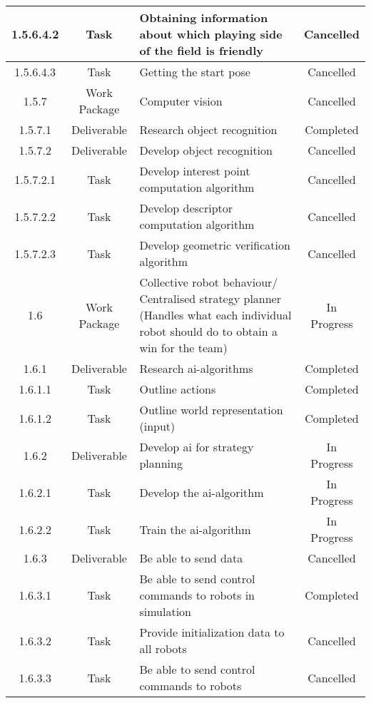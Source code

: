 \begin{longtable}{|c|c|m{}|c|}
    \rowcolor{c} 1.5.6.4.2 & Task & Obtaining information about which playing side of the field is friendly & Cancelled \\ \hline
    \rowcolor{c} 1.5.6.4.3 & Task & Getting the start pose & Cancelled \\ \hline
    \rowcolor{c} 1.5.7 & Work Package & Computer vision & Cancelled \\ \hline
    \rowcolor{d} 1.5.7.1 & Deliverable & Research object recognition & Completed \\ \hline
    \rowcolor{c} 1.5.7.2 & Deliverable & Develop object recognition & Cancelled \\ \hline
    \rowcolor{c} 1.5.7.2.1 & Task & Develop interest point computation algorithm & Cancelled \\ \hline
    \rowcolor{c} 1.5.7.2.2 & Task & Develop descriptor computation algorithm & Cancelled \\ \hline
    \rowcolor{c} 1.5.7.2.3 & Task & Develop geometric verification algorithm & Cancelled \\ \hline
    \rowcolor{p} 1.6 & Work Package & Collective robot behaviour/ Centralised strategy planner (Handles what each individual robot should do to obtain a win for the team) & In Progress \\ \hline
    \rowcolor{d} 1.6.1 & Deliverable & Research \acs{ai}-algorithms & Completed \\ \hline
    \rowcolor{d} 1.6.1.1 & Task & Outline actions & Completed \\ \hline
    \rowcolor{d} 1.6.1.2 & Task & Outline world representation (input) & Completed \\ \hline
    \rowcolor{p} 1.6.2 & Deliverable & Develop \acs{ai} for strategy planning & In Progress \\ \hline
    \rowcolor{p} 1.6.2.1 & Task & Develop the \acs{ai}-algorithm & In Progress \\ \hline
    \rowcolor{p} 1.6.2.2 & Task & Train the \acs{ai}-algorithm & In Progress \\ \hline
    \rowcolor{c} 1.6.3 & Deliverable & Be able to send data & Cancelled \\ \hline
    \rowcolor{d} 1.6.3.1 & Task & Be able to send control commands to robots in simulation & Completed \\ \hline
    \rowcolor{c} 1.6.3.2 & Task & Provide initialization data to all robots & Cancelled \\ \hline
    \rowcolor{c} 1.6.3.3 & Task & Be able to send control commands to robots & Cancelled \\ \hline

\end{longtable}
